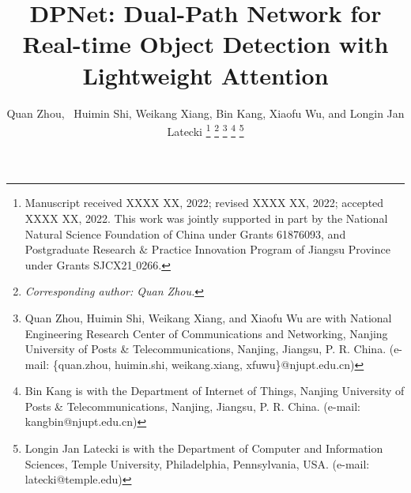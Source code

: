 \documentclass[lettersize,journal]{IEEEtran}
\begin{document}
\title{DPNet: Dual-Path Network for Real-time Object Detection with Lightweight Attention}

\author{Quan Zhou,~ Huimin Shi, Weikang Xiang, Bin Kang, Xiaofu Wu, and Longin Jan Latecki
\thanks{Manuscript received XXXX XX, 2022; revised XXXX XX, 2022; accepted XXXX XX, 2022. This work was jointly supported in part by the National Natural Science Foundation of China under Grants 61876093, and Postgraduate Research $\&$ Practice Innovation Program of Jiangsu Province under Grants SJCX21$\_$0266.}
\thanks{\emph{Corresponding author: Quan Zhou.}}
\thanks{Quan Zhou, Huimin Shi, Weikang Xiang, and Xiaofu Wu are with National Engineering Research Center of Communications and Networking, Nanjing University of Posts \& Telecommunications, Nanjing, Jiangsu, P. R. China. (e-mail: \{quan.zhou, huimin.shi, weikang.xiang, xfuwu\}@njupt.edu.cn)}
\thanks{Bin Kang is with the Department of Internet of Things, Nanjing University of Posts \& Telecommunications, Nanjing, Jiangsu, P. R. China. (e-mail: kangbin@njupt.edu.cn)}
\thanks{Longin Jan Latecki is with the Department of Computer and Information Sciences, Temple University, Philadelphia, Pennsylvania, USA. (e-mail: latecki@temple.edu)}
}






\maketitle
\end{document}
